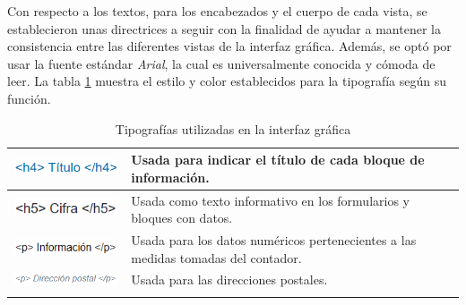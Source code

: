 \documentclass[pdftex,11pt,a4paper]{book}
\begin{document}
Con respecto a los textos, para los encabezados y el cuerpo de cada vista, se establecieron unas directrices a seguir con la finalidad de ayudar a mantener la consistencia entre las diferentes vistas de la interfaz gráfica. Además, se optó por usar la fuente estándar \textit{Arial}, la cual es universalmente conocida y cómoda de leer. La tabla \ref{tablalarga:tablaTipografía} muestra el estilo y color establecidos para la tipografía según su función.

\renewcommand{\tablename}{Tabla}
\renewcommand{\arraystretch}{1,7}

\begin{center}
\begin{longtable}{|>{\centering\arraybackslash}X m{}|m{}|}
\hline
\vspace{-5mm}\includegraphics{images/disenyo/texto-h4.png} & Usada para indicar el título de cada bloque de información.
\\ \hline
\vspace{-4mm}\includegraphics{images/disenyo/texto-h5.png} & Usada como texto informativo en los formularios y bloques con datos.
\\ \hline
\vspace{-4mm}\includegraphics{images/disenyo/texto-p1.png} & Usada para los datos numéricos pertenecientes a las medidas tomadas del contador.
\\ \hline
\vspace{-4mm}\includegraphics{images/disenyo/texto-p2.png} & Usada para las direcciones postales.

\\ \hline
\caption{Tipografías utilizadas en la interfaz gráfica} \label{tablalarga:tablaTipografía}
\end{longtable}
\end{center}

\vspace{-1,5cm}
\end{document}
